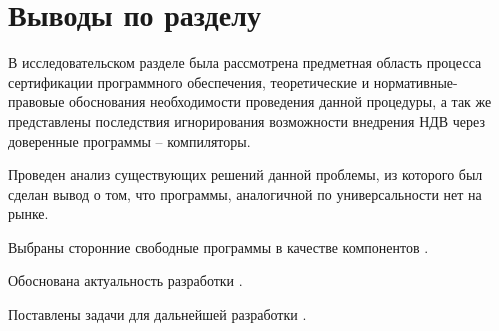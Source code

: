 \section*{Выводы по разделу}\label{sec:ch1/sec5}
В исследовательском разделе была рассмотрена предметная область процесса
сертификации программного обеспечения, теоретические и нормативные-правовые 
обоснования необходимости проведения данной процедуры, а так же представлены
последствия игнорирования возможности внедрения НДВ  через доверенные программы --
компиляторы.

Проведен анализ существующих решений данной проблемы, из которого был сделан
вывод о том, что программы, аналогичной по универсальности {\ProgModule} нет на рынке.

Выбраны сторонние свободные программы в качестве компонентов {\ProgModule}.

Обоснована актуальность разработки {\ProgModule}.

Поставлены задачи для дальнейшей разработки {\ProgModule}.
